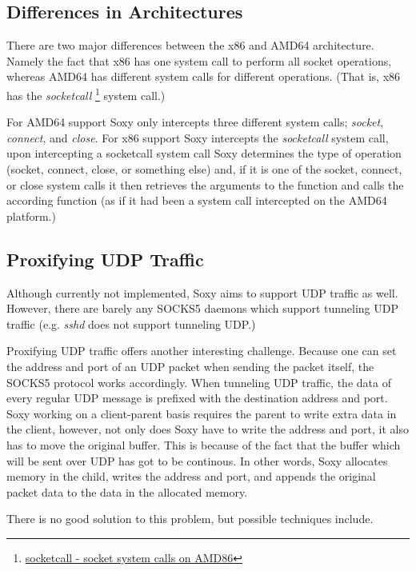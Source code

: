 \documentclass[a4paper, 10pt]{report}
\begin{document}
\subsection{Differences in Architectures}

There are two major differences between the x86 and AMD64 architecture. Namely
the fact that x86 has one system call to perform all socket operations,
whereas AMD64 has different system calls for different operations.
(That is, x86 has the \textit{socketcall}
\footnote{\href{http://linux.die.net/man/2/socketcall}{socketcall - socket
system calls on AMD86}} system call.)

For AMD64 support Soxy only intercepts three different system calls;
\textit{socket}, \textit{connect}, and \textit{close}. For x86 support Soxy
intercepts the \textit{socketcall} system call, upon intercepting a
socketcall system call Soxy determines the type of operation (socket, connect,
close, or something else) and, if it is one of the socket, connect, or close
system calls it then retrieves the arguments to the function and calls the
according function (as if it had been a system call intercepted on the AMD64 
platform.)


\subsection{Proxifying UDP Traffic}

Although currently not implemented, Soxy aims to support UDP traffic as well.
However, there are barely any SOCKS5 daemons which support tunneling UDP
traffic (e.g. \textit{sshd} does not support tunneling UDP.)

Proxifying UDP traffic offers another interesting challenge. Because one can
set the address and port of an UDP packet when sending the packet itself, the
SOCKS5 protocol works accordingly. When tunneling UDP traffic, the data of
every regular UDP message is prefixed with the destination address and port.
Soxy working on a client-parent basis requires the parent to write extra data
in the client, however, not only does Soxy have to write the address and port,
it also has to move the original buffer. This is because of the fact that the
buffer which will be sent over UDP has got to be continous. In other words,
Soxy allocates memory in the child, writes the address and port, and appends
the original packet data to the data in the allocated memory.

There is no good solution to this problem, but possible techniques include.
\end{document}
